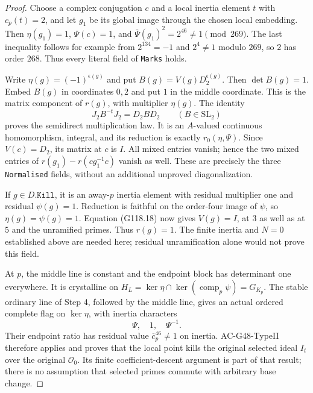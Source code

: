 \begin{proof}
Choose a complex conjugation $c$ and a local inertia element $t$ with
$c_p(t)=2$, and let $g_1$ be its global image through the chosen local embedding.
Then $\eta(g_1)=1$, $\Psi(c)=1$, and
$\overline\Psi(g_1)^2=2^{46}\ne1\pmod{269}$.
The last inequality follows for example from $2^{134}=-1$ and $2^4\ne1$
modulo $269$, so $2$ has order $268$.
Thus every literal field of \texttt{Marks} holds.

Write $\eta(g)=(-1)^{\epsilon(g)}$ and put $B(g)=V(g)D_2^{\epsilon(g)}$.
Then $\det B(g)=1$.  Embed $B(g)$ in coordinates $0,2$ and put $1$ in the
middle coordinate.  This is the matrix component of $r(g)$, with multiplier
$\eta(g)$.  The identity
\[
             J_2B^{-t}J_2=D_2BD_2\qquad(B\in\mathrm{SL}_2)
                                                        \tag{G118.20}
\]
proves the semidirect multiplication law.  It is an $A$-valued continuous
homomorphism, integral, and its reduction is exactly $r_0(\eta,\Psi)$.
Since $V(c)=D_2$, its matrix at $c$ is $I$.
All mixed entries vanish; hence the two mixed entries of
$r(g_1)-r(cg_1^{-1}c)$ vanish as well.  These are precisely the three
\texttt{Normalised} fields, without an additional unproved diagonalization.

If $g\in D.\texttt{Kill}$, it is an away-$p$ inertia element with residual
multiplier one and residual $\psi(g)=1$.
Reduction is faithful on the order-four image of $\psi$, so $\eta(g)=\psi(g)=1$.
Equation (G118.18) now gives $V(g)=I$, at $3$ as well as at $5$ and the
unramified primes.  Thus $r(g)=1$.
The finite inertia and $N=0$ established above are needed here; residual
unramification alone would not prove this field.

At $p$, the middle line is constant and the endpoint block has determinant
one everywhere.  It is crystalline on
$H_L=\ker\eta\cap\ker(\operatorname{comp}_p\psi)=G_{K_p}$.
The stable ordinary line of Step 4, followed by the middle line, gives an
actual ordered complete flag on $\ker\eta$, with inertia characters
\[
                          \Psi,\quad1,\quad\Psi^{-1}.
                                                        \tag{G118.21}
\]
Their endpoint ratio has residual value $\overline c_p^{46}\ne1$ on inertia.
AC-G48-TypeII therefore applies and proves that the local point kills the
original selected ideal $I_t$ over the original $\mathcal O_0$.
Its finite coefficient-descent argument is part of that result; there is no
assumption that selected primes commute with arbitrary base change.


\end{proof}
